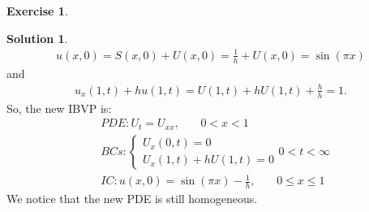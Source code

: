 \documentclass{article}
\theoremstyle{definition}
\newtheorem*{exer*}{Exercise}
\newtheorem*{sln*}{Solution}
\begin{document}
\begin{exer*}
\begin{sln*}
		\begin{align*}
		u(x,0) = S(x,0) + U(x,0) = \frac{1}{h} + U(x,0) = \sin(\pi x)
		\end{align*}
		and
		\begin{align*}
		u_x(1,t) + hu(1,t) = U(1,t) + hU(1,t) + \frac{h}{h} = 1.
		\end{align*}
		So, the new IBVP is:
		\begin{align*}
		&PDE: U_t = U_{xx},\,\,\,\,\,\,\,\,\,\,\, 0<x<1\\
		&BCs:  
		\begin{cases}
		U_x(0,t) = 0\\
		U_x(1,t) + hU(1,t)= 0
		\end{cases} 0 < t < \infty\\
		&IC: u(x,0) = \sin(\pi x)-\frac{1}{h}   ,\,\,\,\,\,\,\,\,\,\,\, 0 \leq x\leq 1
		\end{align*}
		We notice that the new PDE is still homogeneous. 
	\end{sln*}
\end{exer*}
\newpage
\end{document}
